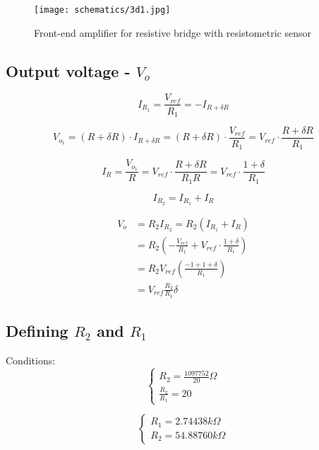\documentclass[10pt,a4paper]{article}
\begin{document}
\begin{figure}[H]
  \centering
  \texttt{[image: schematics/3d1.jpg]}
  \caption{Front-end amplifier for resistive bridge with resistometric sensor}
  \label{3d1graph}
\end{figure}

\subsection{Output voltage - $V_o$}

\begin{equation} \label{I_R1}
  I_{R_1} = \frac{V_{ref}}{R_1} = - I_{R+\delta R}
\end{equation}

\begin{equation} \label{V_o1}
  V_{o_1} = (R+\delta R) \cdot I_{R+\delta R}
  = (R+\delta R) \cdot \frac{V_{ref}}{R_1}
  = V_{ref} \cdot \frac{R+\delta R}{R_1}
\end{equation}

\begin{equation} \label{I_R}
  I_R = \frac{V_{o_1}}{R} = V_{ref} \cdot \frac{R+\delta R}{R_1R}
  = V_{ref} \cdot \frac{1+\delta}{R_1}
\end{equation}

\begin{equation} \label{I_R2}
  I_{R_2} = I_{R_1} + I_R
\end{equation}

\begin{align}
  V_o &= R_2 I_{R_2} = R_2 (I_{R_1} + I_R) \nonumber \\
  &= R_2 \left(- \frac{V_{ref}}{R_1} + V_{ref} \cdot \frac{1+\delta}{R_1} \right) \nonumber \\ 
  &= R_2 V_{ref} \left( \frac{-1+1+\delta}{R_1} \right) \nonumber \\
  &= V_{ref}\frac{R_2}{R_1}\delta \label{V_o}
\end{align}

\subsection{Defining $R_2$ and $R_1$}
Conditions:
\begin{equation} \label{eq:conditions3}
  \left\{
    \begin{array}{l}
      R_2 = \frac{1097752}{20}\Omega \\
      \frac{R_2}{R_1} = 20
    \end{array}
  \right.
\end{equation}

\begin{equation} \label{eq:R2R1_3}
  \left\{
    \begin{array}{l}
      R_1 = 2.74438k\Omega \\
      R_2 = 54.88760k\Omega
    \end{array}
  \right.
\end{equation}
\end{document}
